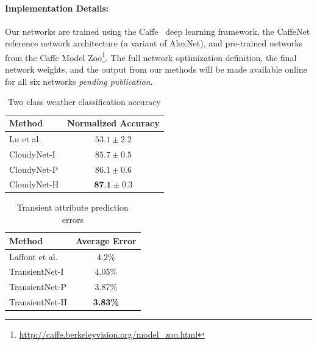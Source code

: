 \documentclass[10pt,twocolumn,letterpaper]{article}
\newcommand{\todo}[1]{\textcolor{red}{todo: {\em #1}}}
\begin{document}
%

\vspace{-1em}
\paragraph{Implementation Details:} Our networks are trained using the
Caffe~\cite{caffe14} deep learning framework, the CaffeNet reference network
architecture (a variant of AlexNet), and pre-trained networks from the Caffe
Model Zoo\footnote{\url{http://caffe.berkeleyvision.org/model_zoo.html}}.  The
full network optimization definition, the final network weights, and the output
from our methods will be made available online for all six networks
\emph{pending publication}.


\begin{table}[t]
	\centering
	\caption{Two class weather classification accuracy}
	\begin{tabular}{ | l | c | }
		\hline
			Method & Normalized Accuracy \\ \hline \hline
			Lu et al.~\cite{lutwoclass}& $ 53.1 \pm 2.2 $ \\ \hline
			CloudyNet-I & $ 85.7 \pm 0.5 $ \\ \hline
			CloudyNet-P & $ 86.1 \pm 0.6 $ \\ \hline
			CloudyNet-H & $ \textbf{87.1} \pm 0.3 $ \\ 
		\hline
	\end{tabular}
	\label{tbl:twoclass}
\end{table}

\begin{table}[t]
	\centering
	\caption{Transient attribute prediction errors}
	\begin{tabular}{ | l | c | }
		\hline
			Method & Average Error \\ \hline \hline
			Laffont et al.~\cite{Laffont14}& 4.2\% \\ \hline
			TransientNet-I & 4.05\% \\ \hline
			TransientNet-P & 3.87\% \\ \hline
			TransientNet-H & \textbf{3.83\%} \\ 
		\hline
	\end{tabular}
	\label{tbl:transient}
\end{table}
\end{document}
